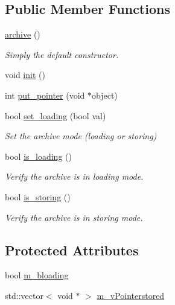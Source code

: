 \subsection*{Public Member Functions}
\begin{DoxyCompactItemize}
\item 
\hyperlink{classeternity_1_1archive_adc5356f74fed2dd5daf230aa1ee6c58e}{archive} ()
\begin{DoxyCompactList}\small\item\em Simply the default constructor. \end{DoxyCompactList}\item 
void \hyperlink{classeternity_1_1archive_a941c3b590afc929089706b92ce4d5e13}{init} ()
\item 
int \hyperlink{classeternity_1_1archive_a2c4ab8d0935b130b38bce44f600bee99}{put\+\_\+pointer} (void $\ast$object)
\item 
bool \hyperlink{classeternity_1_1archive_a759dd5567021290542de13d090aa0963}{set\+\_\+loading} (bool val)
\begin{DoxyCompactList}\small\item\em Set the archive mode (loading or storing) \end{DoxyCompactList}\item 
bool \hyperlink{classeternity_1_1archive_af1ced5c2f5cd028d88033c40ac98cc71}{is\+\_\+loading} ()
\begin{DoxyCompactList}\small\item\em Verify the archive is in loading mode. \end{DoxyCompactList}\item 
bool \hyperlink{classeternity_1_1archive_afbd7e1d21409eae43622049624277405}{is\+\_\+storing} ()
\begin{DoxyCompactList}\small\item\em Verify the archive is in storing mode. \end{DoxyCompactList}\end{DoxyCompactItemize}
\subsection*{Protected Attributes}
\begin{DoxyCompactItemize}
\item 
bool \hyperlink{classeternity_1_1archive_a949b798deac030f2ab45ed54bf26dc4a}{m\+\_\+bloading}
\item 
std\+::vector$<$ void $\ast$ $>$ \hyperlink{classeternity_1_1archive_ae4a796ad260a0f581cf33be4f072d83a}{m\+\_\+v\+Pointerstored}
\end{DoxyCompactItemize}


